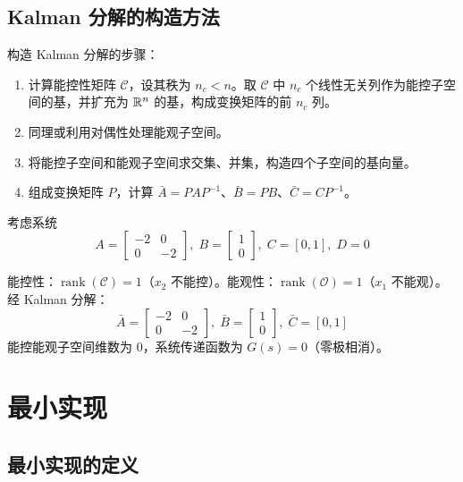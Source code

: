 \subsection{Kalman 分解的构造方法}

构造 Kalman 分解的步骤：

\begin{enumerate}
    \item 计算能控性矩阵 $\mathcal{C}$，设其秩为 $n_c < n$。取 $\mathcal{C}$ 中 $n_c$ 个线性无关列作为能控子空间的基，并扩充为 $\mathbb{R}^n$ 的基，构成变换矩阵的前 $n_c$ 列。
    \item 同理或利用对偶性处理能观子空间。
    \item 将能控子空间和能观子空间求交集、并集，构造四个子空间的基向量。
    \item 组成变换矩阵 $P$，计算 $\bar{A}=PAP^{-1}$、$\bar{B}=PB$、$\bar{C}=CP^{-1}$。
\end{enumerate}

\begin{example}
考虑系统
\[
A = \begin{bmatrix} -2 & 0 \\ 0 & -2 \end{bmatrix},\;
B = \begin{bmatrix} 1 \\ 0 \end{bmatrix},\;
C = [0, 1],\; D = 0
\]

能控性：$\operatorname{rank}(\mathcal{C}) = 1$（$x_2$ 不能控）。能观性：$\operatorname{rank}(\mathcal{O}) = 1$（$x_1$ 不能观）。经 Kalman 分解：
\[
\bar{A} = \begin{bmatrix} -2 & 0 \\ 0 & -2 \end{bmatrix},\;
\bar{B} = \begin{bmatrix} 1 \\ 0 \end{bmatrix},\;
\bar{C} = [0, 1]
\]
能控能观子空间维数为 0，系统传递函数为 $G(s) = 0$（零极相消）。
\end{example}

\section{最小实现}

\subsection{最小实现的定义}

